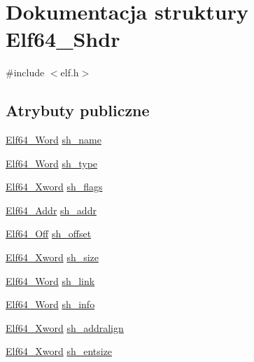 \hypertarget{struct_elf64___shdr}{\section{Dokumentacja struktury Elf64\-\_\-\-Shdr}
\label{struct_elf64___shdr}
}


{\ttfamily \#include $<$elf.\-h$>$}

\subsection*{Atrybuty publiczne}
\begin{DoxyCompactItemize}
\item 
\hyperlink{elf_8h_aa3aa1920ed115b7ef7e99716fece4401}{Elf64\-\_\-\-Word} \hyperlink{struct_elf64___shdr_a18f4475eeec871316099323b512d999d}{sh\-\_\-name}
\item 
\hyperlink{elf_8h_aa3aa1920ed115b7ef7e99716fece4401}{Elf64\-\_\-\-Word} \hyperlink{struct_elf64___shdr_a6379cd77214969499ae99e6e8a46405c}{sh\-\_\-type}
\item 
\hyperlink{elf_8h_a5447a48a3dae0bd24f606415268c6fe4}{Elf64\-\_\-\-Xword} \hyperlink{struct_elf64___shdr_a20aab677eb99c91c0e6c3c5dc8f0f3db}{sh\-\_\-flags}
\item 
\hyperlink{elf_8h_aeed51d08e3a950d637f8ec1f0cd4ef65}{Elf64\-\_\-\-Addr} \hyperlink{struct_elf64___shdr_ac4ee2ceaec74ab5704ebba226e83b200}{sh\-\_\-addr}
\item 
\hyperlink{elf_8h_a6f7837bc80df7a68291fce54ff088849}{Elf64\-\_\-\-Off} \hyperlink{struct_elf64___shdr_afd5e899b00b6527bbecf9cd4bda50112}{sh\-\_\-offset}
\item 
\hyperlink{elf_8h_a5447a48a3dae0bd24f606415268c6fe4}{Elf64\-\_\-\-Xword} \hyperlink{struct_elf64___shdr_a8988fd6e383835e9d51344eddf38ef24}{sh\-\_\-size}
\item 
\hyperlink{elf_8h_aa3aa1920ed115b7ef7e99716fece4401}{Elf64\-\_\-\-Word} \hyperlink{struct_elf64___shdr_a29812c42d9310eb3ad17dcd68ec25536}{sh\-\_\-link}
\item 
\hyperlink{elf_8h_aa3aa1920ed115b7ef7e99716fece4401}{Elf64\-\_\-\-Word} \hyperlink{struct_elf64___shdr_a72dd754689db27582817c0691f7d0c77}{sh\-\_\-info}
\item 
\hyperlink{elf_8h_a5447a48a3dae0bd24f606415268c6fe4}{Elf64\-\_\-\-Xword} \hyperlink{struct_elf64___shdr_ab6b9f67208a04cc0d374203c0a3ab93a}{sh\-\_\-addralign}
\item 
\hyperlink{elf_8h_a5447a48a3dae0bd24f606415268c6fe4}{Elf64\-\_\-\-Xword} \hyperlink{struct_elf64___shdr_a879406e9ddf2bd7e45346d430d0aaa44}{sh\-\_\-entsize}
\end{DoxyCompactItemize}


